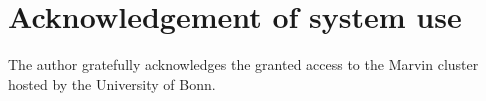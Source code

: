 

\section{Acknowledgement of system use}
\label{sec:acknowledgement_of_system_use}

The author gratefully acknowledges the granted access to the Marvin cluster hosted by the University of Bonn.
